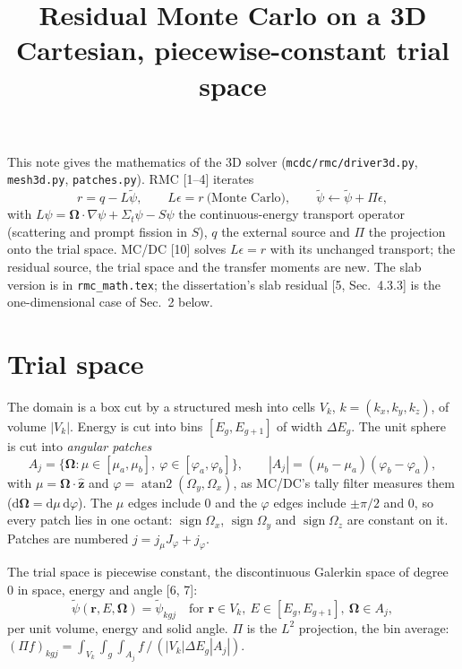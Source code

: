 \documentclass[11pt]{article}
\title{Residual Monte Carlo on a 3D Cartesian, piecewise-constant trial space}
\date{}
\newcommand{\tpsi}{\tilde\psi}
\newcommand{\Sigt}{\Sigma_t}
\newcommand{\Om}{\boldsymbol\Omega}
\begin{document}
\maketitle

\noindent This note gives the mathematics of the 3D solver
(\texttt{mcdc/rmc/driver3d.py}, \texttt{mesh3d.py}, \texttt{patches.py}). RMC
[1--4] iterates
\begin{equation}
  r = q - L\tpsi,\qquad L\epsilon = r\ \text{(Monte Carlo)},\qquad
  \tpsi \leftarrow \tpsi + \Pi\epsilon ,
\end{equation}
with $L\psi = \Om\cdot\nabla\psi + \Sigt\psi - S\psi$ the continuous-energy
transport operator (scattering and prompt fission in $S$), $q$ the external source
and $\Pi$ the projection onto the trial space. MC/DC [10] solves $L\epsilon=r$ with
its unchanged transport; the residual source, the trial space and the transfer
moments are new. The slab version is in \texttt{rmc\_math.tex}; the dissertation's
slab residual [5, Sec.~4.3.3] is the one-dimensional case of Sec.~2 below.

\section{Trial space}

The domain is a box cut by a structured mesh into cells $V_k$, $k=(k_x,k_y,k_z)$, of
volume $|V_k|$. Energy is cut into bins $[E_g,E_{g+1}]$ of width $\Delta E_g$. The
unit sphere is cut into \emph{angular patches}
\begin{equation}
  A_j = \{\Om : \mu\in[\mu_a,\mu_b],\ \varphi\in[\varphi_a,\varphi_b]\},\qquad
  |A_j| = (\mu_b-\mu_a)(\varphi_b-\varphi_a),
\end{equation}
with $\mu=\Om\cdot\hat{\mathbf z}$ and $\varphi=\operatorname{atan2}(\Omega_y,\Omega_x)$,
as MC/DC's tally filter measures them ($\mathrm d\Om=\mathrm d\mu\,\mathrm d\varphi$).
The $\mu$ edges include $0$ and the $\varphi$ edges include $\pm\pi/2$ and $0$, so
every patch lies in one octant: $\operatorname{sign}\Omega_x$,
$\operatorname{sign}\Omega_y$ and $\operatorname{sign}\Omega_z$ are constant on it.
Patches are numbered $j = j_\mu J_\varphi + j_\varphi$.

The trial space is piecewise constant, the discontinuous Galerkin space of degree 0
in space, energy and angle [6, 7]:
\begin{equation}
  \tpsi(\mathbf r,E,\Om) = \tpsi_{kgj}\quad\text{for } \mathbf r\in V_k,\
  E\in[E_g,E_{g+1}],\ \Om\in A_j,
\end{equation}
per unit volume, energy and solid angle. $\Pi$ is the $L^2$ projection, the bin
average: $(\Pi f)_{kgj} = \int_{V_k}\!\int_g\!\int_{A_j} f\,/\,(|V_k|\Delta E_g|A_j|)$.
\end{document}
